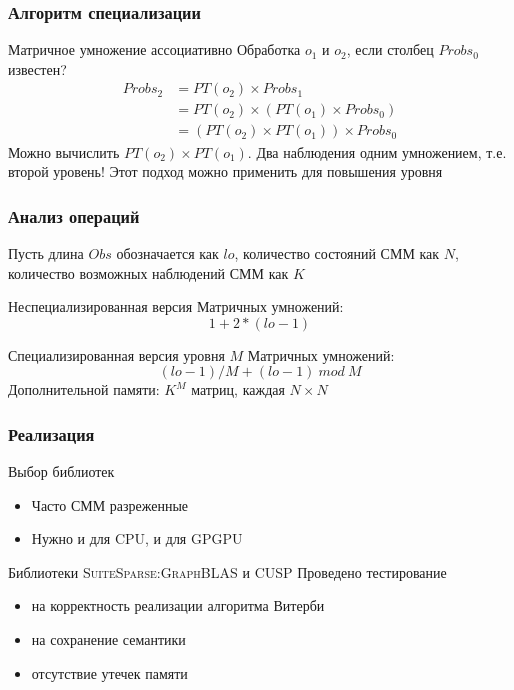 \documentclass{beamer}
\newcommand\name[1]{\textsc{#1}}
\begin{document}
\begin{frame}[fragile]
	\frametitle{Алгоритм специализации}
	Матричное умножение ассоциативно
	\vfill
	Обработка $o_1$ и $o_2$, если столбец $Probs_0$ известен?
\begin{align}
  \mathit{Probs}_{2} &= \mathit{PT}(\mathit{o}_{2}) \times \mathit{Probs}_{1}\nonumber\\
  &= \mathit{PT}(\mathit{o}_{2}) \times (\mathit{PT}(\mathit{o}_{1}) \times \mathit{Probs}_{0}) \nonumber\\
  & =(\mathit{PT}(\mathit{o}_{2}) \times \mathit{PT}(\mathit{o}_{1})) \times \mathit{Probs}_{0}
\end{align}
\vfill
Можно вычислить
$\mathit{PT}(\mathit{o}_{2}) \times \mathit{PT}(\mathit{o}_{1})$. 
Два наблюдения одним умножением, т.е. второй уровень!
\vfill
Этот подход можно применить для повышения уровня
\end{frame}


\begin{frame}[fragile]
	\frametitle{Анализ операций}
	Пусть длина $\mathit{Obs}$ обозначается как $lo$, количество состояний СММ как $N$, количество возможных наблюдений СММ как $K$
	\vfill
	\begin{block}{Неспециализированная версия}
		Матричных умножений: \[1 + 2 \ast (\mathit{lo} - 1)\]
	\end{block}
	\vfill
	\begin{block}{Специализированная версия уровня $M$}
		Матричных умножений: \[\mathit{(lo - 1) / M + (lo - 1)\ mod\ M}\]
		Дополнительной памяти: $\mathit{K^{M}}$ матриц, каждая $N \times N$ 
	\end{block}
	
\end{frame}


\begin{frame}[fragile]
	\frametitle{Реализация}
	Выбор библиотек
	\begin{itemize}
		\item Часто СММ разреженные
		\item Нужно и для CPU, и для GPGPU
	\end{itemize}
	\vfill
	Библиотеки \name{SuiteSparse:GraphBLAS} и \name{CUSP}
	\vfill
	Проведено тестирование
	\begin{itemize}
		\item на корректность реализации алгоритма Витерби
		\item на сохранение семантики
		\item отсутствие утечек памяти
	\end{itemize}
\end{frame}
\end{document}
